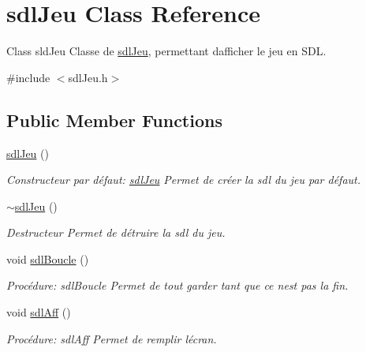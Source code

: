 \hypertarget{classsdlJeu}{}\section{sdl\+Jeu Class Reference}
\label{classsdlJeu}


Class sld\+Jeu Classe de \hyperlink{classsdlJeu}{sdl\+Jeu}, permettant d\textquotesingle{}afficher le jeu en S\+DL.  




{\ttfamily \#include $<$sdl\+Jeu.\+h$>$}

\subsection*{Public Member Functions}
\begin{DoxyCompactItemize}
\item 
\hyperlink{classsdlJeu_a06ba2075a4b592f6d0a2e268c29a044e}{sdl\+Jeu} ()
\begin{DoxyCompactList}\small\item\em Constructeur par défaut\+: \hyperlink{classsdlJeu}{sdl\+Jeu} Permet de créer la sdl du jeu par défaut. \end{DoxyCompactList}\item 
\mbox{\label{classsdlJeu_a5bcd8f5ed17a2cea2ad2fc633415cbcc}} 
\hyperlink{classsdlJeu_a5bcd8f5ed17a2cea2ad2fc633415cbcc}{$\sim$sdl\+Jeu} ()
\begin{DoxyCompactList}\small\item\em Destructeur Permet de détruire la sdl du jeu. \end{DoxyCompactList}\item 
void \hyperlink{classsdlJeu_a5628835d7efcab056985c3aa3de56836}{sdl\+Boucle} ()
\begin{DoxyCompactList}\small\item\em Procédure\+: sdl\+Boucle Permet de tout garder tant que ce n\textquotesingle{}est pas la fin. \end{DoxyCompactList}\item 
void \hyperlink{classsdlJeu_aedada55e3f96ba37493664d358dc7b60}{sdl\+Aff} ()
\begin{DoxyCompactList}\small\item\em Procédure\+: sdl\+Aff Permet de remplir l\textquotesingle{}écran. \end{DoxyCompactList}\end{DoxyCompactItemize}


